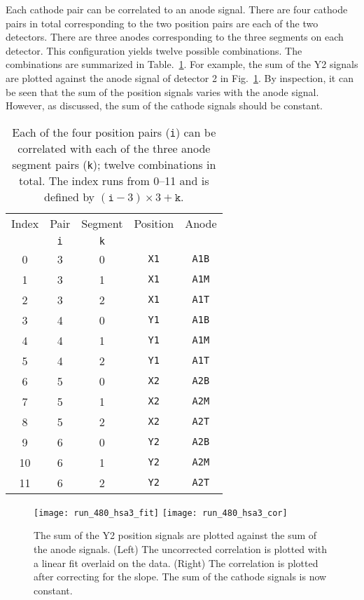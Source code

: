 Each cathode pair can be correlated to an anode signal.  There are four cathode pairs in total corresponding to the two position pairs are each of the two detectors. There are three anodes %
 corresponding to the three %
 segments on each detector. This configuration yields twelve possible combinations.  The combinations are summarized in Table.~\ref{position-andode}.  For example, the sum of the Y2 signals are plotted against the anode signal of detector 2 in Fig.~\ref{hsa}.  By inspection, it can be seen that the sum of the position signals varies with the anode signal.  However, as discussed, the sum of the cathode signals should be constant.
\begin{table}[ht!]%
\centering  
\begin{tabular}{ccccc}
\hline
\multicolumn{1}{c}{Index} & \multicolumn{1}{c}{Pair}& \multicolumn{1}{c}{Segment}& Position & Anode \\
&\multicolumn{1}{c}{\texttt{i}}&\multicolumn{1}{c}{\texttt{k}}\\ \hline \hline
 0 & 3 & 0 & \texttt{X1} & \texttt{A1B} \\
 1 & 3 & 1 & \texttt{X1} & \texttt{A1M} \\
 2 & 3 & 2 & \texttt{X1} & \texttt{A1T} \\
 3 & 4 & 0 & \texttt{Y1} & \texttt{A1B} \\
 4 & 4 & 1 & \texttt{Y1} & \texttt{A1M} \\
 5 & 4 & 2 & \texttt{Y1} & \texttt{A1T} \\
 6 & 5 & 0 & \texttt{X2} & \texttt{A2B} \\
 7 & 5 & 1 & \texttt{X2} & \texttt{A2M} \\
 8 & 5 & 2 & \texttt{X2} & \texttt{A2T} \\
 9 & 6 & 0 & \texttt{Y2} & \texttt{A2B} \\
10 & 6 & 1 & \texttt{Y2} & \texttt{A2M} \\
11 & 6 & 2 & \texttt{Y2} & \texttt{A2T} \\
 \hline 
\end{tabular}
\caption{Each of the four position pairs (\texttt{i}) can be correlated with each of the three anode segment pairs (\texttt{k}); twelve combinations in total. The index runs from 0--11 and is defined by $(\texttt{i}-3)\times 3 + \texttt{k}$.}
\label{position-andode}
\end{table}
\begin{figure}[ht]
\centering
\hspace{\fill}
\texttt{[image: run\_480\_hsa3\_fit]}\hspace{\fill}
\texttt{[image: run\_480\_hsa3\_cor]} \hspace{\fill}
\caption{The sum of the Y2 position signals are plotted against the sum of the anode signals.
(Left) The uncorrected correlation is plotted with a linear fit overlaid on the data.
(Right) The correlation is plotted after correcting for the slope.  The sum of the cathode signals is now constant.}
\label{hsa}
\end{figure}

